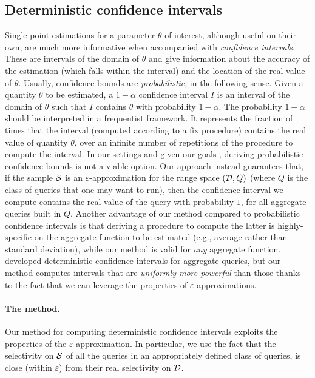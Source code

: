 \subsection{Deterministic confidence intervals}\label{sec:confint}
Single point estimations for a parameter $\theta$ of interest, although useful on
their own, are much more informative when accompanied with \emph{confidence
intervals}. These are intervals of the domain of $\theta$ and give information
about the accuracy of the estimation (which falls within the interval) and the
location of the real value of $\theta$. Usually, confidence bounds are
\emph{probabilistic}, in the following sense. Given a quantity $\theta$ to be
estimated, a $1-\alpha$ confidence interval $I$ is an interval of the domain of
$\theta$ such that $I$ contains $\theta$ with probability $1-\alpha$. The
probability $1-\alpha$ should be interpreted in a frequentist framework. It
represents the fraction of times that the interval (computed according to a fix
procedure) contains the real value of quantity $\theta$, over an infinite number
of repetitions of the procedure to compute the
interval. In our settings and given our goals , deriving probabilistic confidence bounds is not a viable
option. 
Our approach instead guarantees that, if the sample ${\cal S}$ is an
$\varepsilon$-approximation for the range space $({\cal D},Q)$ (where $Q$ is the
class of queries that one may want to run), then the confidence interval we
compute contains the real value of the query with probability $1$, for all
aggregate queries built in $Q$. Another advantage of our method compared to
probabilistic confidence intervals is that deriving a procedure to compute the
latter is highly-specific on the aggregate function to be estimated (e.g.,
average rather than standard deviation), while our method is valid for
\emph{any} aggregate function. \citet{Haas96} developed deterministic confidence
intervals for aggregate queries, but our method computes intervals that are
\emph{uniformly more powerful} than those thanks to the fact that we can
leverage the properties of
$\varepsilon$-approximations.


\paragraph{The method.} Our method for computing deterministic confidence
intervals exploits the properties of the $\varepsilon$-approximation. 
In particular, we use the fact that the selectivity on ${\cal S}$ of all the queries in an
appropriately defined class of queries, is close (within $\varepsilon$) from
their real selectivity on ${\cal D}$.

